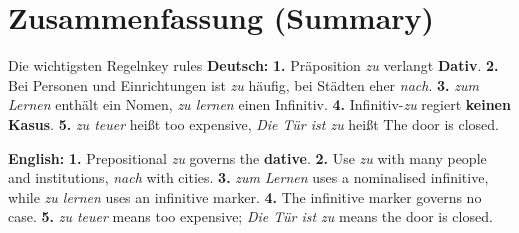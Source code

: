 \documentclass[a4paper,11pt]{article}
\newcommand{\GermanText}[1]{\textbf{Deutsch: }#1\par}
\newcommand{\EnglishText}[1]{{\small\color{SoftGray}\textbf{English: }#1\par}}
\begin{document}
\section{Zusammenfassung (Summary)}
\begin{grammarentry}{Die wichtigsten Regeln}{key rules}
\GermanText{\textbf{1.} Präposition \emph{zu} verlangt \textbf{Dativ}. \textbf{2.} Bei Personen und Einrichtungen ist \emph{zu} häufig, bei Städten eher \emph{nach}. \textbf{3.} \emph{zum Lernen} enthält ein Nomen, \emph{zu lernen} einen Infinitiv. \textbf{4.} Infinitiv-\emph{zu} regiert \textbf{keinen Kasus}. \textbf{5.} \emph{zu teuer} heißt \glqq too expensive\grqq{}, \emph{Die Tür ist zu} heißt \glqq The door is closed\grqq{}.}
\EnglishText{\textbf{1.} Prepositional \emph{zu} governs the \textbf{dative}. \textbf{2.} Use \emph{zu} with many people and institutions, \emph{nach} with cities. \textbf{3.} \emph{zum Lernen} uses a nominalised infinitive, while \emph{zu lernen} uses an infinitive marker. \textbf{4.} The infinitive marker governs no case. \textbf{5.} \emph{zu teuer} means too expensive; \emph{Die Tür ist zu} means the door is closed.}
\end{grammarentry}
\end{document}
